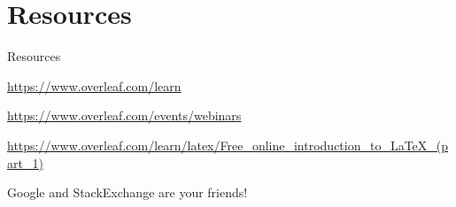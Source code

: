 \documentclass[13pt]{beamer}
\newcommand{\itemA}{\item[\textcolor{black}{\textbullet}]}
\newcommand{\green}{\textcolor{colorgreen}}
\begin{document}
\section{Resources}
\begin{frame}{Resources}
 \begin{fullpageitemize}
 \small
 \itemA\green{\url{https://www.overleaf.com/learn}}
 \itemA\green{\url{https://www.overleaf.com/events/webinars}}
 \itemA \green{\url{https://www.overleaf.com/learn/latex/Free_online_introduction_to_LaTeX_(part_1)}}
 \itemA Google and StackExchange are your friends!
 \end{fullpageitemize}
\end{frame}





\end{document}
